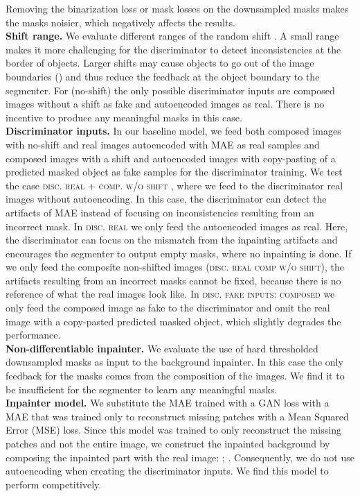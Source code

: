 \documentclass{article}
\begin{document}
Removing the binarization loss or mask losses on the downsampled masks makes the masks  noisier, which negatively affects the results. \\
\textbf{Shift range. } We evaluate different ranges of the random shift . A small range  makes it more challenging for the discriminator to detect inconsistencies at the border of objects.
Larger shifts may cause objects to go out of the image boundaries () and thus reduce the feedback at the object boundary to the segmenter.
For  (no-shift) the only possible discriminator inputs are composed images without a shift as fake and autoencoded images as real. There is no incentive to produce any meaningful masks in this case. \\
\textbf{Discriminator inputs.} In our baseline model, we feed both composed images with no-shift and real images autoencoded with MAE as real samples and composed images with a shift and autoencoded images with copy-pasting of a predicted masked object as fake samples for the discriminator training.
We test the case \textsc{disc. real  + comp. w/o shift }, where we feed to the discriminator real images without autoencoding. In this case, the discriminator can detect the artifacts of MAE instead of focusing on inconsistencies resulting from an incorrect mask. In \textsc{disc. real } we only feed the autoencoded images as real. Here, the discriminator can focus on the mismatch from the inpainting artifacts and encourages the segmenter to output empty masks, where no inpainting is done. If we only feed the composite non-shifted images (\textsc{disc. real comp w/o shift}), the artifacts resulting from an incorrect masks cannot be fixed, because there is no reference of what the real images look like. In \textsc{disc. fake inputs: composed} we only feed the composed image as fake to the discriminator and omit the real image with a copy-pasted predicted masked object, which slightly degrades the performance. \\
\textbf{Non-differentiable inpainter.} We evaluate the use of hard thresholded downsampled masks as input to the background inpainter. In this case the only feedback for the masks comes from the composition of the images. We find it to be insufficient for the segmenter to learn any meaningful masks.\\
\textbf{Inpainter model.} We substitute the MAE trained with a GAN loss with a MAE that was trained only to reconstruct missing patches with a Mean Squared Error (MSE) loss.
Since this model was trained to only reconstruct the missing patches and not the entire image, we construct the inpainted background by composing the inpainted part with the real image: ; . Consequently, we do not use autoencoding when creating the discriminator inputs. We find this model to perform competitively.\\
\end{document}
